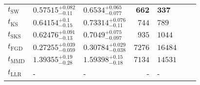 \begin{tabular}{l|llr|llr}
	\midrule
	$t_{\mathrm{SW}}$ & $0.57515_{-0.11}^{+0.082}$ & $0.6534_{-0.077}^{+0.065}$ & ${\mathbf{662}}$ & ${\mathbf{337}}$ \\
	$t_{\overline{\mathrm{KS}}}$ & $0.64154_{-0.15}^{+0.1}$ & $0.73314_{-0.11}^{+0.076}$ & $744$ & $789$ \\
	$t_{\mathrm{SKS}}$ & $0.62476_{-0.13}^{+0.091}$ & $0.7049_{-0.097}^{+0.075}$ & $935$ & $1044$ \\
	$t_{\mathrm{FGD}}$ & ${\mathbf{0.27255_{-0.059}^{+0.039}}}$ & ${\mathbf{0.30784_{-0.038}^{+0.029}}}$ & $7276$ & $16484$ \\
	$t_{\mathrm{MMD}}$ & $1.39355_{-0.28}^{+0.19}$ & $1.59398_{-0.18}^{+0.15}$ & $7134$ & $14531$ \\
	$t_{\mathrm{LLR}}$ & - & - & - & - \\
	\bottomrule
\end{tabular}